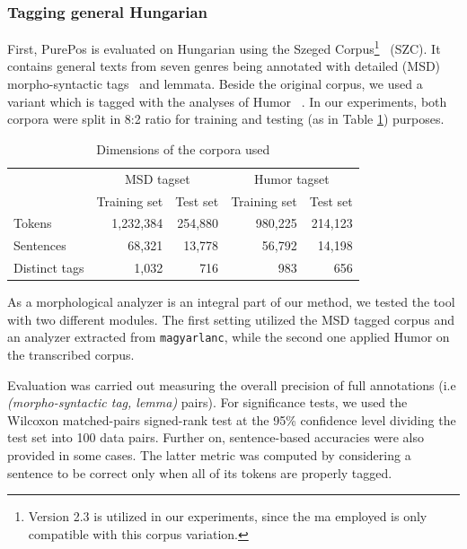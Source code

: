 \subsubsection{Tagging general Hungarian}\label{sec:porepos-gen}

First, PurePos is evaluated on Hungarian using the Szeged Corpus\footnote{Version 2.3 is utilized in our experiments, since the \acrshort{ma} employed is only compatible with this corpus variation.}~\cite{Csendes2004} (SZC). 
It contains general texts from seven genres being annotated with detailed (MSD) morpho-syntactic tags~\cite{Erjavec2012} and lemmata. %
Beside the original corpus, we used a variant which is tagged with the analyses of Humor ~\cite{Proszeky1994,Novak2003,Proszeky2005}. 
In our experiments, both corpora were split in 8:2 ratio for training and testing (as in Table \ref{tab:szeged-corpus}) purposes. 

\begin{table}[H]
\centering
\caption{Dimensions of the corpora used}
\begin{tabular}{l r r r r}
  \hline
  & \multicolumn{2}{c}{MSD tagset} & \multicolumn{2}{c}{Humor tagset} \\
  &  Training set &  Test set &  Training set &  Test set  \\
  \hline
  Tokens &  1,232,384 &  254,880 &  980,225 &  214,123 \\
  Sentences &  68,321 &  13,778 &  56,792 &  14,198 \\
  Distinct tags &  1,032 &  716 &  983 &  656 \\
  \hline
\end{tabular}
\label{tab:szeged-corpus}
\end{table}

As a morphological analyzer is an integral part of our method, we tested the tool with two different modules. 
The first setting utilized the MSD tagged corpus and an analyzer extracted from \texttt{magyarlanc}, while the second one applied Humor on the transcribed corpus.

Evaluation was carried out measuring the overall precision of full annotations (i.e \emph{(morpho-syntactic tag, lemma)} pairs). 
For significance tests, we used the Wilcoxon matched-pairs signed-rank test at the 95\% confidence level dividing the test set into 100 data pairs.
Further on, sentence-based accuracies were also provided in some cases. 
The latter metric was computed by considering a sentence to be correct only when all of its tokens are properly tagged. 

